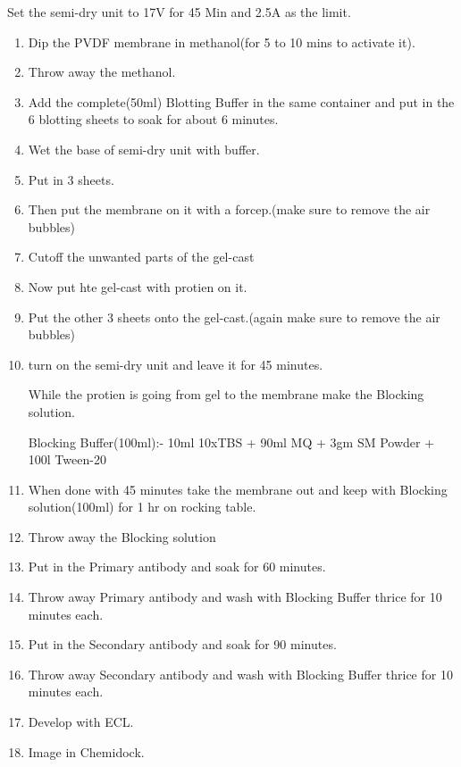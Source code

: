 \documentclass[11pt,twoside,a4paper]{article}
\begin{document}
Set the semi-dry unit to 17V for 45 Min and 2.5A as the limit.
\begin{enumerate}
	\item Dip the PVDF membrane in methanol(for 5 to 10 mins to activate it).
	\item Throw away the methanol.
	\item Add the complete(50ml) Blotting Buffer in the same container and put in the 6 blotting sheets to soak for about 6 minutes.
	\item Wet the base of semi-dry unit with buffer.
	\item Put in 3 sheets.
	\item Then put the membrane on it with a forcep.(make sure to remove the air bubbles)
	\item Cutoff the unwanted parts of the gel-cast
	\item Now put hte gel-cast with protien on it.
	\item Put the other 3 sheets onto the gel-cast.(again make sure to remove the air bubbles)
	\item turn on the semi-dry unit and leave it for 45 minutes.

		While the protien is going from gel to the membrane make the Blocking solution.

		Blocking Buffer(100ml):- 10ml 10xTBS + 90ml MQ + 3gm SM Powder + 100\textmu{}l Tween-20
	\item When done with 45 minutes take the membrane out and keep with Blocking solution(100ml) for 1 hr on rocking table.
	\item Throw away the Blocking solution
	\item Put in the Primary antibody and soak for 60 minutes.
	\item Throw away Primary antibody and wash with Blocking Buffer thrice for 10 minutes each.
	\item Put in the Secondary antibody and soak for 90 minutes.
	\item Throw away Secondary antibody and wash with Blocking Buffer thrice for 10 minutes each.
	\item Develop with ECL.
	\item Image in Chemidock.
\end{enumerate}
\end{document}
